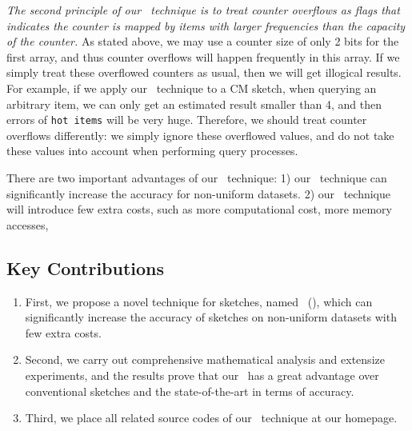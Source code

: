 \textit{The second principle of our \aname~technique is to treat counter overflows as flags that indicates the counter is mapped by items with larger frequencies than the capacity of the counter.}
As stated above, we may use a counter size of only 2 bits for the first array, and thus counter overflows will happen frequently in this array.
If we simply treat these overflowed counters as usual, then we will get illogical results.
For example, if we apply our \aname~technique to a CM sketch, when querying an arbitrary item, we can only get an estimated result smaller than 4, and then errors of \texttt{hot items} will be very huge.
Therefore, we should treat counter overflows differently: we simply ignore these overflowed values, and do not take these values into account when performing query processes.

There are two important advantages of our \aname~technique:
1) our \aname~technique can significantly increase the accuracy for non-uniform datasets.
2) our \aname~technique will introduce few extra costs, such as more computational cost, more memory accesses, \etc

\presub
\subsection{Key Contributions} \postsub

\begin{enumerate}
	\item First, we propose a novel technique for sketches, named \fname~(\aname), which can significantly increase the accuracy of sketches on non-uniform datasets with few extra costs.
	\item Second, we carry out comprehensive mathematical analysis and extensize experiments, and the results prove that our \aname~has a great advantage over conventional sketches and the state-of-the-art in terms of accuracy.
	\item Third, we place all related source codes of our \aname~technique at our homepage.
\end{enumerate}